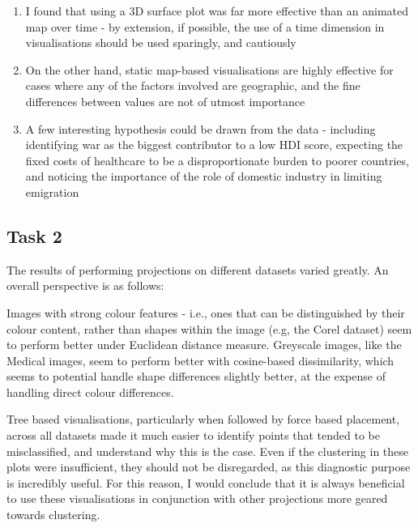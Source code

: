 \documentclass[ 10pt ]{fphw}
\begin{document}
\begin{enumerate}
    \item I found that using a 3D surface plot was far more effective than an animated map over time - by extension, if possible, the use of a time dimension in visualisations should be used sparingly, and cautiously
    \item On the other hand, static map-based visualisations are highly effective for cases where any of the factors involved are geographic, and the fine differences between values are not of utmost importance
    \item A few interesting hypothesis could be drawn from the data - including identifying war as the biggest contributor to a low HDI score, expecting the fixed costs of healthcare to be a disproportionate burden to poorer countries, and noticing the importance of the role of domestic industry in limiting emigration
\end{enumerate}

\subsection{Task 2}

The results of performing projections on different datasets varied greatly. An overall perspective is as follows:

Images with strong colour features - i.e., ones that can be distinguished by their colour content, rather than shapes within the image (e.g, the Corel dataset) seem to perform better under Euclidean distance measure.  Greyscale images, like the Medical images, seem to perform better with cosine-based dissimilarity, which seems to potential handle shape differences slightly better, at the expense of handling direct colour differences.

Tree based visualisations, particularly when followed by force based placement, across all datasets made it much easier to identify points that tended to be misclassified, and understand why this is the case. Even if the clustering in these plots were insufficient, they should not be disregarded, as this diagnostic purpose is incredibly useful. For this reason, I would conclude that it is always beneficial to use these visualisations in conjunction with other projections more geared towards clustering. 
\end{document}
